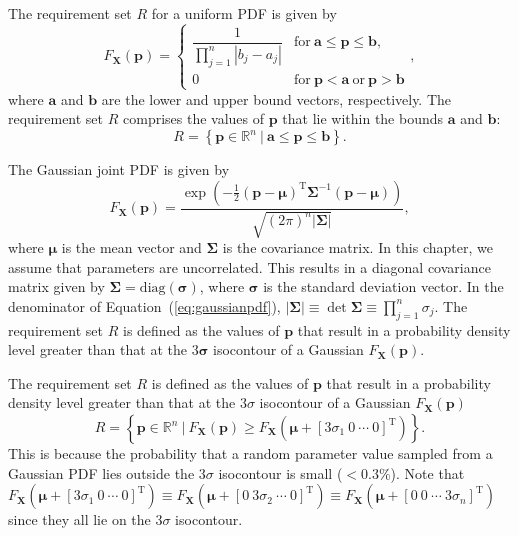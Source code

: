 The requirement set $R$ for a uniform \ac{PDF} is given by
%
\begin{equation} \label{eq:uniformpdf}
	F_\mathbf{X}(\mathbf{p})={\begin{cases}{\dfrac {1}{\prod\limits_{j=1}^{n} \left|b_j - a_j\right|}}&\mathrm {for} \ \mathbf{a}\leq \mathbf{p}\leq \mathbf{b},\\[8pt]0&\mathrm {for} \ \mathbf{p}<\mathbf{a}\ \mathrm {or} \ \mathbf{p}>\mathbf{b}\end{cases}},
\end{equation}
%
where $\mathbf{a}$ and $\mathbf{b}$ are the lower and upper bound vectors, respectively. The requirement set $R$ comprises the values of $\mathbf{p}$ that lie within the bounds $\mathbf{a}$ and $\mathbf{b}$:
%
\begin{equation} \label{eq:requirementsetuniform}
	\textit{R} = \left\{\mathbf{p} \in \mathbb{R}^n~|~\mathbf{a}\leq \mathbf{p}\leq \mathbf{b}\right\}.
\end{equation}

The Gaussian joint \ac{PDF} is given by
%
\begin{equation} \label{eq:gaussianpdf}
	F_\mathbf{X}(\mathbf{p})={\frac {\exp \left(-{\frac {1}{2}}({\mathbf {p} }-{\boldsymbol {\mu }})^{\mathrm {T} }{\boldsymbol {\Sigma }}^{-1}({\mathbf {p} }-{\boldsymbol {\mu }})\right)}{\sqrt {(2\pi )^{n}|{\boldsymbol {\Sigma }}|}}},
\end{equation}
%
where $\boldsymbol{\mu}$ is the mean vector and $\boldsymbol{\Sigma}$ is the covariance matrix. In this chapter, we assume that parameters are uncorrelated. This results in a diagonal covariance matrix given by $\boldsymbol{\Sigma} = \mathrm{diag}\left(\boldsymbol{\sigma}\right)$, where $\boldsymbol{\sigma}$ is the standard deviation vector. In the denominator of Equation~(\ref{eq:gaussianpdf}), $|{\boldsymbol {\Sigma }}|\equiv \det {\boldsymbol {\Sigma }} \equiv \prod\limits_{j=1}^{n} \sigma_j$. The requirement set $R$ is defined as the values of $\mathbf{p}$ that result in a probability density level greater than that at the $3 \boldsymbol{\sigma}$ isocontour of a Gaussian $F_\mathbf{X}(\mathbf{p})$.

The requirement set $R$ is defined as the values of $\mathbf{p}$ that result in a probability density level greater than that at the $3{\sigma}$ isocontour of a Gaussian $F_\mathbf{X}(\mathbf{p})$
%
\begin{equation} \label{eq:requirementsetgaussian}
	\textit{R} = \left\{\mathbf{p} \in \mathbb{R}^n~|~F_\mathbf{X}(\mathbf{p}) \geq F_\mathbf{X}(\boldsymbol{\mu} + \left[3\sigma_1~0~\cdots~0\right]^\mathrm{T}) \right\}.
\end{equation}
%
This is because the probability that a random parameter value sampled from a Gaussian \ac{PDF} lies outside the $3\sigma$ isocontour is small ($<0.3\%$). Note that $F_\mathbf{X}(\boldsymbol{\mu} + \left[3\sigma_1~0~\cdots~0\right]^\mathrm{T}) \equiv F_\mathbf{X}(\boldsymbol{\mu} + \left[0~3\sigma_2~\cdots~0\right]^\mathrm{T}) \equiv F_\mathbf{X}(\boldsymbol{\mu} + \left[0~0~\cdots~3\sigma_n\right]^\mathrm{T})$ since they all lie on the $3\sigma$ isocontour.

